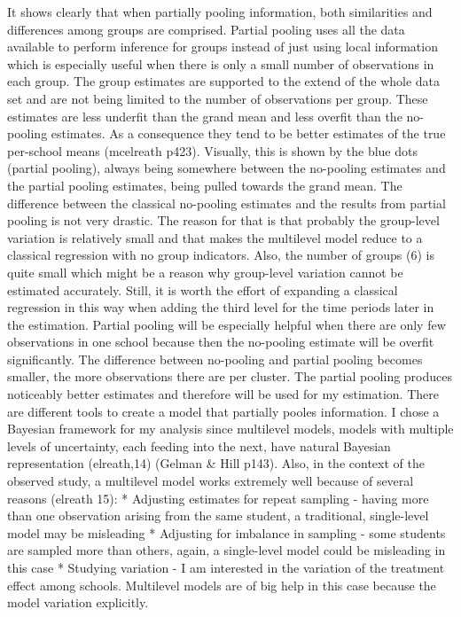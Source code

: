 \documentclass[a4, 12pt]{article}
\begin{document}
It shows clearly that when partially pooling information, both similarities and differences among groups are comprised. Partial pooling uses all the data available to perform inference for groups instead of just using local information which is especially useful when there is only a small number of observations in each group. The group estimates are supported to the extend of the whole data set and are not being limited to the number of observations per group. These estimates are less underfit than the grand mean and less overfit than the no-pooling estimates. As a consequence they tend to be better estimates of the true per-school means (mcelreath p423). Visually, this is shown by the blue dots (partial pooling), always being somewhere between the no-pooling estimates and the partial pooling estimates, being pulled towards the grand mean. The difference between the classical no-pooling estimates and the results from partial pooling is not very drastic. The reason for that is that probably the group-level variation is relatively small and that makes the multilevel model reduce to a classical regression with no group indicators. Also, the number of groups (6) is quite small which might be a reason why group-level variation cannot be estimated accurately. Still, it is worth the effort of expanding a classical regression in this way when adding the third level for the time periods later in the estimation. Partial pooling will be especially helpful when there are only few observations in one school because then the no-pooling estimate will be overfit significantly. The difference between no-pooling and partial pooling becomes smaller, the more observations there are per cluster. The partial pooling produces noticeably better estimates and therefore will be used for my estimation. There are different tools to create a model that partially pooles information. I chose a Bayesian framework for my analysis since multilevel models, models with multiple levels of uncertainty, each feeding into the next, have natural Bayesian representation (elreath,14) (Gelman \& Hill p143). Also, in the context of the observed study, a multilevel model works extremely well because of several reasons (elreath 15):
* Adjusting estimates for repeat sampling - having more than one observation arising from the same student, a traditional, single-level model may be misleading
* Adjusting for imbalance in sampling - some students are sampled more than others, again, a single-level model could be misleading in this case
* Studying variation - I am interested in the variation of the treatment effect among schools. Multilevel models are of big help in this case because the model variation explicitly.
\end{document}
